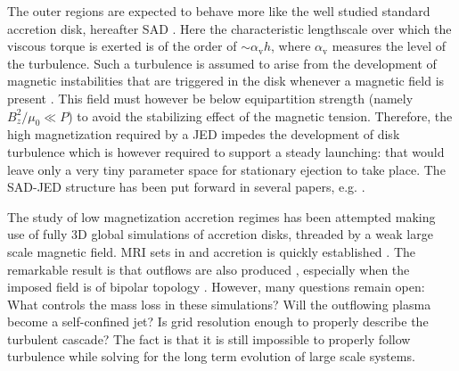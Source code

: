 \documentclass{aa}
\begin{document}
The outer regions are expected to behave more like the well studied standard accretion disk, hereafter SAD \citep{1973A&A....24..337S,2002apa..book.....F}. Here the characteristic lengthscale over
which the viscous torque is exerted is of the order of $\sim \alpha_\mathrm{v} h$, where $\alpha_\mathrm{v}$ measures the level of the turbulence. Such a turbulence is assumed to arise from the development of magnetic
instabilities that are triggered in the disk whenever a magnetic field is present \citep{1991ApJ...376..214B}. This field must however be below equipartition strength (namely $B_z^2/\mu_0 \ll P$) to
avoid the stabilizing effect of the magnetic tension. Therefore, the high magnetization required by a JED impedes the development of disk turbulence which is however required to support
a steady launching: that would leave only a very tiny parameter space for stationary ejection to take place.
The SAD-JED structure has been put forward in several papers, e.g. \citet{2006A&A...447..813F,2008A&A...479..481C,2008NewAR..52...42F}.

The study of low magnetization accretion regimes has been attempted making use of fully 3D global simulations of accretion disks, threaded by a weak large scale magnetic field.
MRI sets in and accretion is quickly established \citep{2002ApJ...573..738H}. The remarkable result is that outflows are also produced \citep{2003ApJ...592.1042I}, 
especially when the imposed field is of bipolar topology \citep{Beckwith:2009ss}.  
However, many questions remain open: What controls the mass loss in these simulations? Will the outflowing plasma become a self-confined jet? Is grid resolution enough to properly describe the turbulent 
cascade? The fact is that it is still impossible to properly follow turbulence while solving for the long term evolution of large scale systems.
\end{document}
